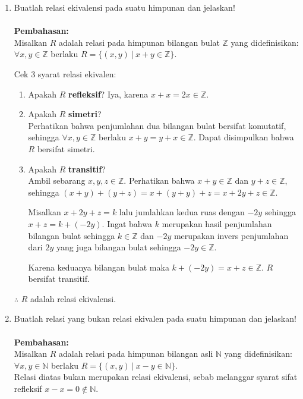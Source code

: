 \documentclass{article}
\begin{document}
\begin{enumerate}
    \item Buatlah relasi ekivalensi pada suatu himpunan dan jelaskan!\\~\\
    \textbf{Pembahasan:}\\
    Misalkan $R$ adalah relasi pada himpunan bilangan bulat $\mathbb{Z}$ yang didefinisikan: $\forall x,y\in \mathbb{Z}$ berlaku $R=\{(x,y)\:|\:x+y\in \mathbb{Z}\}$.
    
    \vspace{0.1mm}
    Cek 3 syarat relasi ekivalen:
    \begin{enumerate}[label=(\arabic*)]
        \item Apakah $R$ \textbf{refleksif}? Iya, karena $x+x=2x\in \mathbb{Z}$.
        \item Apakah $R$ \textbf{simetri}?\\
        Perhatikan bahwa penjumlahan dua bilangan bulat bersifat komutatif, sehingga $\forall x,y\in \mathbb{Z}$ berlaku $x+y=y+x\in\mathbb{Z}$. Dapat disimpulkan bahwa $R$ bersifat simetri.
        \item Apakah $R$ \textbf{transitif}?\\
        Ambil sebarang $x,y,z\in\mathbb{Z}$. Perhatikan bahwa $x+y\in\mathbb{Z}$ dan $y+z\in\mathbb{Z}$, sehingga $(x+y)+(y+z)=x+(y+y)+z=x+2y+z\in\mathbb{Z}$.
        
        \vspace{1mm}
        Misalkan $x+2y+z=k$ lalu jumlahkan kedua ruas dengan $-2y$ sehingga $x+z=k+(-2y)$. Ingat bahwa $k$ merupakan hasil penjumlahan bilangan bulat sehingga $k\in\mathbb{Z}$ dan $-2y$ merupakan invers penjumlahan dari $2y$ yang juga bilangan bulat sehingga $-2y\in\mathbb{Z}$.
        
        \vspace{1mm}
        Karena keduanya bilangan bulat maka $k+(-2y)=x+z\in\mathbb{Z}$. $R$ bersifat transitif. 
    \end{enumerate}
    $\therefore$ $R$ adalah relasi ekivalensi.

    \item Buatlah relasi yang bukan relasi ekivalen pada suatu himpunan dan jelaskan!\\~\\
    \textbf{Pembahasan:}\\
    Misalkan $R$ adalah relasi pada himpunan bilangan asli $\mathbb{N}$ yang didefinisikan: $\forall x,y\in \mathbb{N}$ berlaku $R=\{(x,y)\:|\:x-y\in \mathbb{N}\}$.\\
    Relasi diatas bukan merupakan relasi ekivalensi, sebab melanggar syarat sifat refleksif $x-x=0\notin\mathbb{N}$.

\end{enumerate}
\end{document}
